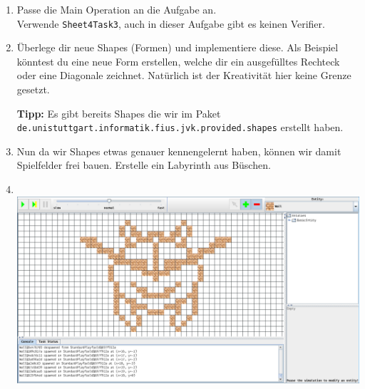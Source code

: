 
\begin{enumerate}
	\item
	Passe die Main Operation an die Aufgabe an.\\
	Verwende \lstinline{Sheet4Task3}, auch in dieser Aufgabe gibt es keinen Verifier.
	
	\item
	Überlege dir neue Shapes (Formen) und implementiere diese.
	Als Beispiel könntest du eine neue Form erstellen, welche dir ein ausgefülltes Rechteck oder eine Diagonale zeichnet.
	Natürlich ist der Kreativität hier keine Grenze gesetzt.
	
	\textbf{Tipp:} Es gibt bereits Shapes die wir im Paket \lstinline{de.unistuttgart.informatik.fius.jvk.provided.shapes} erstellt haben.
	
	\item
	Nun da wir Shapes etwas genauer kennengelernt haben, können wir damit Spielfelder frei bauen.
	Erstelle ein Labyrinth aus Büschen.
	
	\item
	\\
		\includegraphics[width=\linewidth]{./figures/playfield.png}

\end{enumerate}

\newpage
